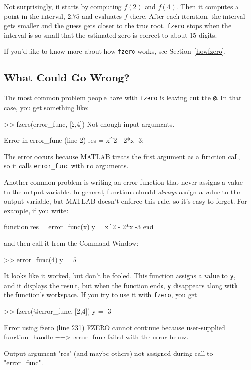 Not surprisingly, it starts by computing $f(2)$ and $f(4)$.  Then it computes a point in the interval, $2.75$ and evaluates $f$ there.  After each iteration, the interval gets smaller and the guess gets closer to the true root.
{\tt fzero} stops when the interval is so small that the estimated
zero is correct to about 15 digits.
 
If you'd like to know more about how {\tt fzero} works, see Section~\ref{howfzero}.


\subsection{What Could Go Wrong?}

The most common problem people have with {\tt fzero} is leaving
out the {\tt @}.  In that case, you get something like:

\begin{code}
>> fzero(error_func, [2,4])
Not enough input arguments.

Error in error_func (line 2)
    res = x^2 - 2*x -3;
\end{code}

The error occurs because MATLAB treats the first argument as a function call, so it calls {\tt error\_func} with no arguments.


Another common problem is writing an error function that never
assigns a value to the output variable.  In general, functions should
{\em always} assign a value to the output variable, but MATLAB doesn't
enforce this rule, so it's easy to forget.  For example, if you
write:

\begin{code}
function res = error_func(x)
    y = x^2 - 2*x -3
end
\end{code}

and then call it from the Command Window:

\begin{code}
>> error_func(4)
y = 5
\end{code}

It looks like it worked, but don't be fooled.  This function assigns
a value to {\tt y}, and it displays the result, but when the function
ends, {\tt y} disappears along with the function's workspace.
If you try to use it with {\tt fzero}, you get

\begin{code}
>> fzero(@error_func, [2,4])
y = -3

Error using fzero (line 231)
FZERO cannot continue because user-supplied function_handle ==>
error_func failed with the error below.

Output argument "res" (and maybe others) not assigned during call
to "error_func".
\end{code}

